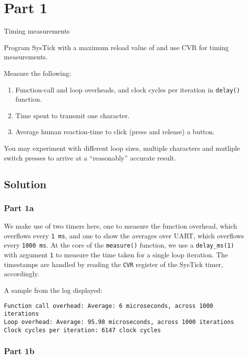 \section*{Part 1}

Timing measurements

Program SysTick with a maximum reload value of  and use CVR for timing measurements.

Measure the following:
\begin{enumerate}[label= (\alph*), noitemsep, topsep=0pt]
    \item Function-call and loop overheads, and clock cycles per iteration in \texttt{delay\@()} function.
    \item Time spent to transmit one character.
    \item Average human reaction-time to click (press and release) a button.
\end{enumerate}

You may experiment with different loop sizes, multiple characters and mutliple switch presses to arrive at a ``reasonably'' accurate result.

\subsection*{Solution}

\subsubsection*{Part 1a}

We make use of two timers here, one to measure the function overhead, which overflows every \texttt{1\,ms}, and one to show the averages over UART, which overflows every \texttt{1000\,ms}.
At the core of the \texttt{measure\@()} function, we use a \texttt{delay\_ms\@(1)} with argument \texttt{1} to measure the time taken for a single loop iteration.
The timestamps are handled by reading the \texttt{CVR} register of the SysTick timer, accordingly.

A sample from the log displayed:
\begin{verbatim}
Function call overhead: Average: 6 microseconds, across 1000 iterations
Loop overhead: Average: 95.98 microseconds, across 1000 iterations
Clock cycles per iteration: 6147 clock cycles
\end{verbatim}

\subsubsection*{Part 1b}

